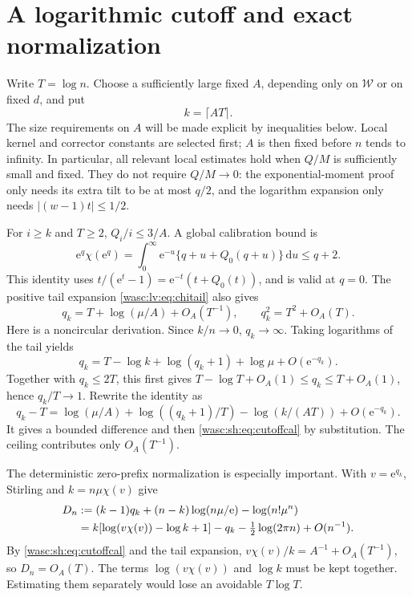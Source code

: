 \documentclass[11pt,a4paper]{article}
\theoremstyle{remark}\newtheorem{remark}[theorem]{Remark}
\newcommand{\dd}{\,\mathrm d}\newcommand{\ee}{\mathrm e}\newcommand{\Wc}{\mathcal W}
\numberwithin{equation}{section}
\begin{document}
\section{A logarithmic cutoff and exact normalization}\label{wasc:sh:sec:cutoff}
Write $T=\log n$. Choose a sufficiently large fixed $A$, depending only on $\Wc$ or on fixed $d$, and put
\begin{equation}\label{wasc:sh:eq:cutoff}
k=\lceil AT\rceil.
\end{equation}
The size requirements on $A$ will be made explicit by inequalities below. Local kernel and corrector constants are selected first; $A$ is then fixed before $n$ tends to infinity. In particular, all relevant local estimates hold when $Q/M$ is sufficiently small and fixed. They do not require $Q/M\to0$: the exponential-moment proof only needs its extra tilt to be at most $q/2$, and the logarithm expansion only needs $|(w-1)t|\le1/2$.

For $i\ge k$ and $T\ge2$, $Q_i/i\le3/A$. A global calibration bound is
\begin{equation}\label{wasc:sh:eq:globalchi}
\ee^q\chi(\ee^q)
=\int_0^\infty\ee^{-u}\{q+u+Q_0(q+u)\}\dd u\le q+2.
\end{equation}
This identity uses $t/(\ee^t-1)=\ee^{-t}(t+Q_0(t))$, and is valid at $q=0$. The positive tail expansion \eqref{wasc:lv:eq:chitail} also gives
\begin{equation}\label{wasc:sh:eq:cutoffcal}
q_k=T+\log(\mu/A)+O_A(T^{-1}),\qquad q_k^2=T^2+O_A(T).
\end{equation}
Here is a noncircular derivation. Since $k/n\to0$, $q_k\to\infty$. Taking logarithms of the tail yields
\[
q_k=T-\log k+\log(q_k+1)+\log\mu+O(\ee^{-q_k}).
\]
Together with $q_k\le2T$, this first gives
$T-\log T+O_A(1)\le q_k\le T+O_A(1)$, hence $q_k/T\to1$.
Rewrite the identity as
\[
q_k-T=\log(\mu/A)+\log((q_k+1)/T)-\log(k/(AT))+O(\ee^{-q_k}).
\]
It gives a bounded difference and then \eqref{wasc:sh:eq:cutoffcal} by substitution. The ceiling contributes only $O_A(T^{-1})$.

The deterministic zero-prefix normalization is especially important. With $v=\ee^{q_k}$, Stirling and $k=n\mu\chi(v)$ give
\begin{align}\label{wasc:sh:eq:normalcancel}
D_n&:=(k-1)q_k+(n-k)\log(n\mu/\ee)-\log(n!\mu^n)\notag\\
&=k[\log(v\chi(v))-\log k+1]-q_k-\tfrac12\log(2\pi n)+O(n^{-1}).
\end{align}
By \eqref{wasc:sh:eq:cutoffcal} and the tail expansion,
$v\chi(v)/k=A^{-1}+O_A(T^{-1})$, so $D_n=O_A(T)$. The terms $\log(v\chi(v))$ and $\log k$ must be kept together. Estimating them separately would lose an avoidable $T\log T$.
\end{document}
